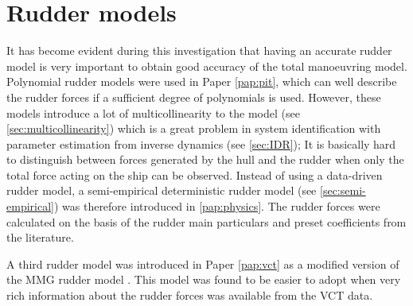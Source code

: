 \section{Rudder models} \label{sec:rudders}
It has become evident during this investigation that having an accurate rudder model is very important to obtain good accuracy of the total manoeuvring model. Polynomial rudder models were used in Paper \ref{pap:pit}, which can well describe the rudder forces if a sufficient degree of polynomials is used. However, these models introduce a lot of multicollinearity to the model (see \autoref{sec:multicollinearity}) which is a great problem in system identification with parameter estimation from inverse dynamics (see \autoref{sec:IDR}); It is basically hard to distinguish between forces generated by the hull and the rudder when only the total force acting on the ship can be observed. Instead of using a data-driven rudder model, a semi-empirical deterministic rudder model (see \autoref{sec:semi-empirical}) was therefore introduced in \ref{pap:physics}. The rudder forces were calculated on the basis of the rudder main particulars and preset coefficients from the literature.

A third rudder model was introduced in Paper \ref{pap:vct} as a modified version of the MMG rudder model \cite{yasukawaIntroductionMMGStandard2015}. This model was found to be easier to adopt when very rich information about the rudder forces was available from the VCT data.


